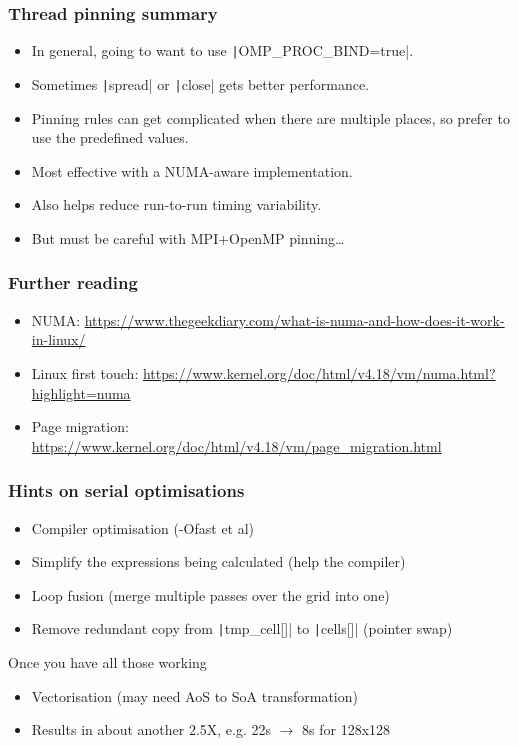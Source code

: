 \documentclass{beamer}
\begin{document}
\begin{frame}
\frametitle{Thread pinning summary}
\begin{itemize}
  \item In general, going to want to use \texttt|OMP_PROC_BIND=true|.
  \item Sometimes \texttt|spread| or \texttt|close| gets better performance.
  \item Pinning rules can get complicated when there are multiple places, so prefer to use the predefined values.
  \item Most effective with a NUMA-aware implementation.
  \item Also helps reduce run-to-run timing variability.
  \item But must be careful with MPI+OpenMP pinning\dots
\end{itemize}
\end{frame}


\begin{frame}
\frametitle{Further reading}
\begin{itemize}
  \item NUMA: \url{https://www.thegeekdiary.com/what-is-numa-and-how-does-it-work-in-linux/}
  \item Linux first touch: \url{https://www.kernel.org/doc/html/v4.18/vm/numa.html?highlight=numa}
  \item Page migration: \url{https://www.kernel.org/doc/html/v4.18/vm/page_migration.html}
\end{itemize}


\end{frame}


\begin{frame}
\frametitle{Hints on serial optimisations}
\begin{itemize}
  \item Compiler optimisation (-Ofast et al)
  \item Simplify the expressions being calculated (help the compiler)
  \item Loop fusion (merge multiple passes over the grid into one)
  \item Remove redundant copy from \texttt|tmp_cell[]| to \texttt|cells[]| (pointer swap)
\end{itemize}
Once you have all those working
\begin{itemize}
  \item Vectorisation (may need AoS to SoA transformation)
  \item Results in about another 2.5X, e.g. 22s $\rightarrow$ 8s for 128x128
\end{itemize}

\end{frame}

\end{document}

